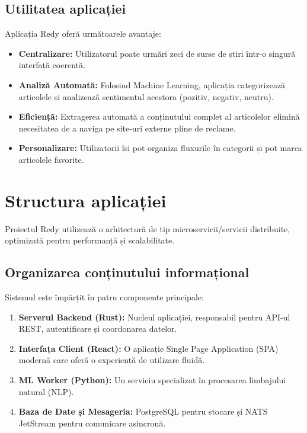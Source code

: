 \documentclass[12pt,a4paper]{article}
\begin{document}
	\subsection{Utilitatea aplicației}
	Aplicația Redy oferă următoarele avantaje:
	\begin{itemize}
		\item \textbf{Centralizare:} Utilizatorul poate urmări zeci de surse de știri într-o singură interfață coerentă.
		\item \textbf{Analiză Automată:} Folosind Machine Learning, aplicația categorizează articolele și analizează sentimentul acestora (pozitiv, negativ, neutru).
		\item \textbf{Eficiență:} Extragerea automată a conținutului complet al articolelor elimină necesitatea de a naviga pe site-uri externe pline de reclame.
		\item \textbf{Personalizare:} Utilizatorii își pot organiza fluxurile în categorii și pot marca articolele favorite.
	\end{itemize}
	
	\section{Structura aplicației}
	
	Proiectul Redy utilizează o arhitectură de tip microservicii/servicii distribuite, optimizată pentru performanță și scalabilitate.
	
	\subsection{Organizarea conținutului informațional}
	Sistemul este împărțit în patru componente principale:
	\begin{enumerate}
		\item \textbf{Serverul Backend (Rust):} Nucleul aplicației, responsabil pentru API-ul REST, autentificare și coordonarea datelor.
		\item \textbf{Interfața Client (React):} O aplicație Single Page Application (SPA) modernă care oferă o experiență de utilizare fluidă.
		\item \textbf{ML Worker (Python):} Un serviciu specializat în procesarea limbajului natural (NLP).
		\item \textbf{Baza de Date și Mesageria:} PostgreSQL pentru stocare și NATS JetStream pentru comunicare asincronă.
	\end{enumerate}
	
\end{document}
